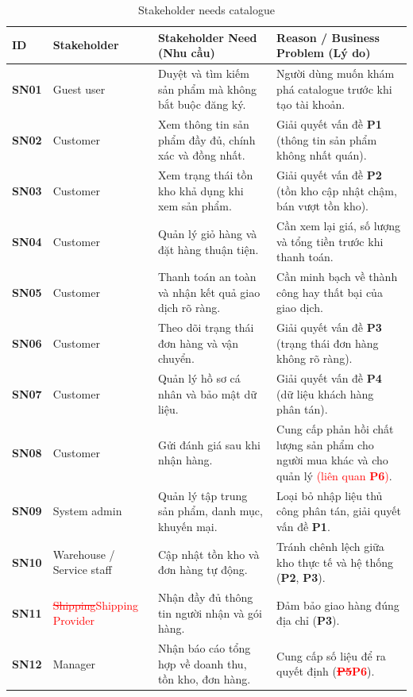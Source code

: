 \documentclass[12pt,a4paper,oneside]{report}
\newif\ifmark \marktrue
\newcommand{\chg}[1]{\ifmark\textcolor{red}{#1}\else #1\fi}
\newcommand{\del}[1]{\ifmark\textcolor{red}{\sout{#1}}\fi}
\begin{document}
\begin{longtable}{p{1.6cm}p{3cm}p{6cm}p{5.4cm}}
\caption{Stakeholder needs catalogue}\\
\toprule
\textbf{ID} & \textbf{Stakeholder} & \textbf{Stakeholder Need (Nhu cầu)} & \textbf{Reason / Business Problem (Lý do)} \\
\midrule
\endhead
\bottomrule
\endlastfoot
\textbf{SN01} & Guest user & Duyệt và tìm kiếm sản phẩm mà không bắt buộc đăng ký. & Người dùng muốn khám phá catalogue trước khi tạo tài khoản. \\
\textbf{SN02} & Customer & Xem thông tin sản phẩm đầy đủ, chính xác và đồng nhất. & Giải quyết vấn đề \textbf{P1} (thông tin sản phẩm không nhất quán). \\
\textbf{SN03} & Customer & Xem trạng thái tồn kho khả dụng khi xem sản phẩm. & Giải quyết vấn đề \textbf{P2} (tồn kho cập nhật chậm, bán vượt tồn kho). \\
\textbf{SN04} & Customer & Quản lý giỏ hàng và đặt hàng thuận tiện. & Cần xem lại giá, số lượng và tổng tiền trước khi thanh toán. \\
\textbf{SN05} & Customer & Thanh toán an toàn và nhận kết quả giao dịch rõ ràng. & Cần minh bạch về thành công hay thất bại của giao dịch. \\
\textbf{SN06} & Customer & Theo dõi trạng thái đơn hàng và vận chuyển. & Giải quyết vấn đề \textbf{P3} (trạng thái đơn hàng không rõ ràng). \\
\textbf{SN07} & Customer & Quản lý hồ sơ cá nhân và bảo mật dữ liệu. & Giải quyết vấn đề \textbf{P4} (dữ liệu khách hàng phân tán). \\
\textbf{SN08} & Customer & Gửi đánh giá sau khi nhận hàng. & Cung cấp phản hồi chất lượng sản phẩm cho người mua khác và cho quản lý \chg{(liên quan \textbf{P6})}. \\
\textbf{SN09} & System admin & Quản lý tập trung sản phẩm, danh mục, khuyến mại. & Loại bỏ nhập liệu thủ công phân tán, giải quyết vấn đề \textbf{P1}. \\
\textbf{SN10} & Warehouse / Service staff & Cập nhật tồn kho và đơn hàng tự động. & Tránh chênh lệch giữa kho thực tế và hệ thống (\textbf{P2}, \textbf{P3}). \\
\textbf{SN11} & \del{Shipping}\chg{Shipping Provider} & Nhận đầy đủ thông tin người nhận và gói hàng. & Đảm bảo giao hàng đúng địa chỉ (\textbf{P3}). \\
\textbf{SN12} & Manager & Nhận báo cáo tổng hợp về doanh thu, tồn kho, đơn hàng. & Cung cấp số liệu để ra quyết định (\del{\textbf{P5}}\chg{\textbf{P6}}). \\

\end{longtable}
\end{document}
